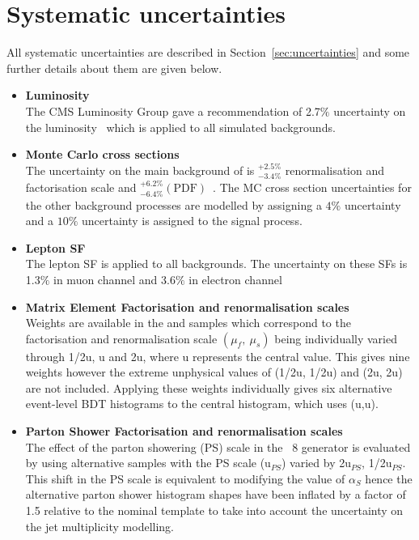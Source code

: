 \section{Systematic uncertainties}
\label{sec:uncertainties13}
All systematic uncertainties are described in Section~\ref{sec:uncertainties} and some further details about them are given below.

\begin{itemize}
\item \textbf{Luminosity}\\
The CMS Luminosity Group gave a recommendation of 2.7$\%$ uncertainty on the luminosity~\cite{CMS-PAS-LUM-15-001} which is applied to all simulated backgrounds.
\item \textbf{Monte Carlo cross sections}\\
The uncertainty on the main background of \ttbar is ${}^{+2.5\%}_{-3.4\%}$ renormalisation and factorisation scale and ${}^{+6.2\%}_{-6.4\%} \left( \textrm{PDF} \right)$~\cite{PhysRevLett.110.252004}. The MC cross section uncertainties for the other background processes are modelled by assigning a $4\%$ uncertainty and a $10\%$ uncertainty is assigned to the signal process.
\item \textbf{Lepton SF}\\
The lepton SF is applied to all backgrounds. The uncertainty on these SFs is 1.3$\%$ in muon channel and 3.6$\%$ in electron channel
\item \textbf{Matrix Element Factorisation and renormalisation scales}\\
Weights are available in the \ttbar and \tttt samples which correspond to the factorisation and renormalisation scale $\left(\mu_{f},~\mu_{s}\right)$ being individually varied through 1/2u, u and 2u, where u represents the central value. This gives nine weights however the extreme unphysical values of (1/2u, 1/2u) and (2u, 2u) are not included. Applying these weights individually gives six alternative event-level BDT histograms to the central histogram, which uses (u,u). 
\item \textbf{Parton Shower Factorisation and renormalisation scales}\\
The effect of the parton showering (PS) scale in the \PYTHIA~8 generator is evaluated by using alternative \ttbar samples with the PS scale (u$_{PS}$) varied by 2u$_{PS}$, 1/2u$_{PS}$. This shift in the PS scale is equivalent to modifying the value of $\alpha_{S}$ hence the alternative parton shower histogram shapes have been inflated by a factor of 1.5 relative to the nominal template to take into account the uncertainty on the jet multiplicity modelling.

\end{itemize}
